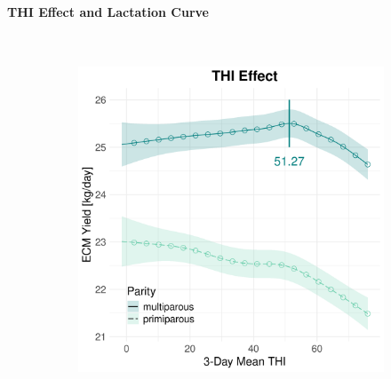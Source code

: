 \newpage
\paragraph{THI Effect and Lactation Curve} \quad \\
\begin{figure}[H]
    \centering
    \begin{subfigure}[b]{0.45\textwidth}
        \centering
        \includegraphics[width=\textwidth]{thesis/figures/models/ecm/full/bs_ecm_full/bs_ecm_full_marginal_thi_milk_combined.png}
    \end{subfigure}
    \hspace{0.05\textwidth} %
    \begin{subfigure}[b]{0.45\textwidth}
        \centering

\end{subfigure}
\end{figure}
